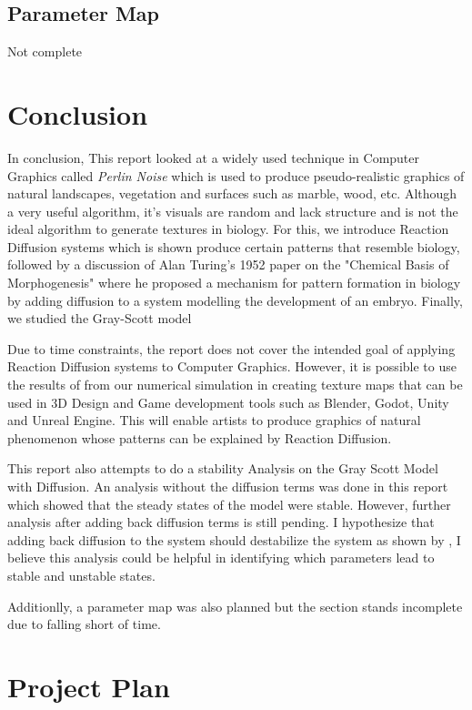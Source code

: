 \documentclass[a4paper, 11pt]{article}
\begin{document}
\subsection{Parameter Map}
Not complete


\section{Conclusion}
\label{sec:conclusion}
In conclusion, This report looked at a widely used technique in Computer Graphics called \emph{Perlin Noise} which is used to produce pseudo-realistic graphics of natural landscapes, vegetation and surfaces such as marble, wood, etc. Although a very useful algorithm, it's visuals are random and lack structure and is not the ideal algorithm to generate textures in biology. For this, we introduce Reaction Diffusion systems which is shown produce certain patterns that resemble biology, followed by a discussion of Alan Turing's 1952 paper on the "Chemical Basis of Morphogenesis" where he proposed a mechanism for pattern formation in biology by adding diffusion to a system modelling the development of an embryo. Finally, we studied the Gray-Scott model       


Due to time constraints, the report does not cover the intended goal of applying Reaction Diffusion systems to Computer Graphics. However, it is possible to use the results of from our numerical simulation in creating texture maps that can be used in 3D Design and Game development tools such as Blender, Godot, Unity and Unreal Engine. This will enable artists to produce graphics of natural phenomenon whose patterns can be explained by Reaction Diffusion. 

This report also attempts to do a stability Analysis on the Gray Scott Model with Diffusion. An analysis without the diffusion terms was done in this report which showed that the steady states of the model were stable. However, further analysis after adding back diffusion terms is still pending. I hypothesize that adding back diffusion to the system should destabilize the system as shown by \parencite{turing1952}, I believe this analysis could be helpful in identifying which parameters lead to stable and unstable states.   

Additionlly, a parameter map was also planned but the section stands incomplete due to falling short of time. 
\printbibliography

\pagebreak

\section{Project Plan}
\label{sec:plan}
\end{document}

